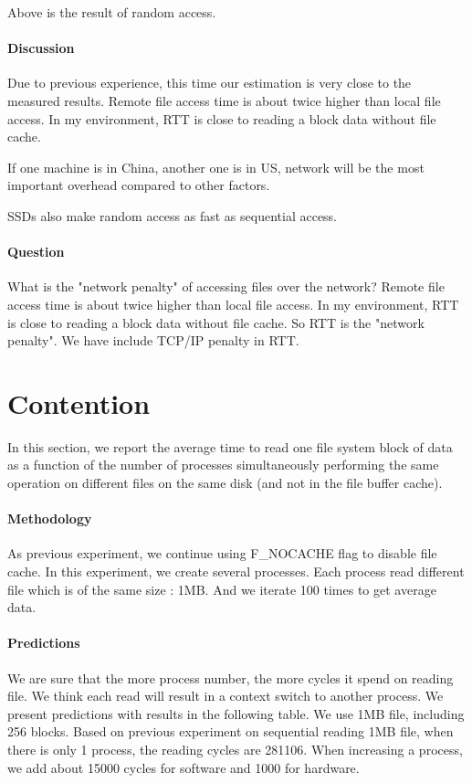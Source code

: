 Above is the result of random access.

\paragraph{Discussion}
Due to previous experience, this time our estimation is very close to the measured results. Remote file access time is about twice higher than local file access. In my environment, RTT is close to reading a block data without file cache.

If one machine is in China, another one is in US,  network will be the most important overhead compared to other factors.

SSDs also make random access as fast as sequential access.

\paragraph{Question} What is the "network penalty" of accessing files over the network?  Remote file access time is about twice higher than local file access. In my environment, RTT is close to reading a block data without file cache. So RTT is the "network penalty". We have include TCP/IP penalty in RTT.

\section{Contention}
In this section, we report the average time to read one file system block of data as a function of the number of processes simultaneously performing the same operation on different files on the same disk (and not in the file buffer cache).

\paragraph{Methodology}
As previous experiment, we continue using F\_NOCACHE flag to disable file cache. In this experiment, we create several processes. Each process read different file which is of the same size : 1MB. And we iterate 100 times to get average data. 

\paragraph{Predictions}
We are sure that the more process number, the more cycles it spend on reading file. We think each read will result in a context switch to another process. We present predictions with results in the following table. We use 1MB file, including 256 blocks. Based on previous experiment on sequential reading 1MB file, when there is only 1 process, the reading cycles are 281106. When increasing a process, we add about 15000 cycles for software and 1000 for hardware.


